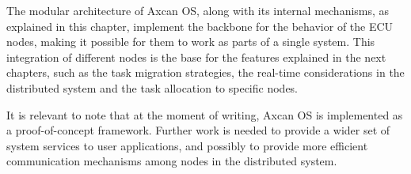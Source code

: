 The modular architecture of Axcan OS, along with its internal mechanisms, as explained in this chapter, implement the backbone for the behavior of the ECU nodes, making it possible for them to work as parts of a single system. This integration of different nodes is the base for the features explained in the next chapters, such as the task migration strategies, the real-time considerations in the distributed system and the task allocation to specific nodes.

It is relevant to note that at the moment of writing, Axcan OS is implemented as a proof-of-concept framework. Further work is needed to provide a wider set of system services to user applications, and possibly to provide more efficient communication mechanisms among nodes in the distributed system.


